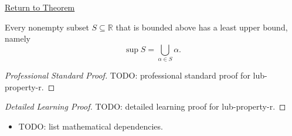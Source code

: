 \newpage
{}
\label{prf:lub-property-r}

\begin{remark*}[Return]
\hyperref[thm:lub-property-r]{Return to Theorem}
\end{remark*}

\begin{theorem*}
Every nonempty subset $S\subseteq\mathbb{R}$ that is bounded above has a least
upper bound, namely
\[
\sup S=\bigcup_{\alpha\in S}\alpha.
\]
\end{theorem*}

\begin{proof}[Professional Standard Proof]
\LRAProofBodyStart
TODO: professional standard proof for lub-property-r.
\end{proof}

\begin{proof}[Detailed Learning Proof]
\LRAProofBodyStart
TODO: detailed learning proof for lub-property-r.
\end{proof}

\begin{remark*}
\end{remark*}

\begin{dependencies}
\begin{itemize}
  \item TODO: list mathematical dependencies.
\end{itemize}
\end{dependencies}

\clearpage
